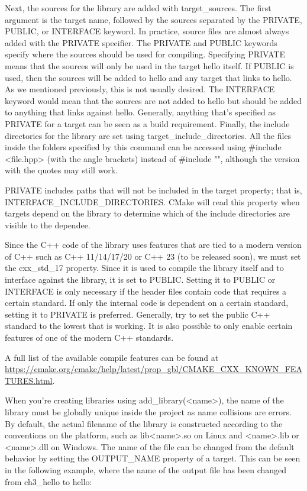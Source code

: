 Next, the sources for the library are added with target\_sources. The first argument is the target name, followed by the sources separated by the PRIVATE, PUBLIC, or INTERFACE keyword. In practice, source files are almost always added with the PRIVATE specifier. The PRIVATE and PUBLIC keywords specify where the sources should be used for compiling. Specifying PRIVATE means that the sources will only be used in the target hello itself. If PUBLIC is used, then the sources will be added to hello and any target that links to hello. As we mentioned previously, this is not usually desired. The INTERFACE keyword would mean that the sources are not added to hello but should be added to anything that links against hello. Generally, anything that's specified as PRIVATE for a target can be seen as a build requirement. Finally, the include directories for the library are set using target\_include\_directories. All the files inside the folders specified by this command can be accessed using \#include <file.hpp> (with the angle brackets) instead of \#include "", although the version with the quotes may still work.

PRIVATE includes paths that will not be included in the target property; that is, INTERFACE\_INCLUDE\_DIRECTORIES. CMake will read this property when targets depend on the library to determine which of the include directories are visible to the dependee.

Since the C++ code of the library uses features that are tied to a modern version of C++ such as C++ 11/14/17/20 or C++ 23 (to be released soon), we must set the cxx\_std\_17 property. Since it is used to compile the library itself and to interface against the library, it is set to PUBLIC. Setting it to PUBLIC or INTERFACE is only necessary if the header files contain code that requires a certain standard. If only the internal code is dependent on a certain standard, setting it to PRIVATE is preferred. Generally, try to set the public C++ standard to the lowest that is working. It is also possible to only enable certain features of one of the modern C++ standards.

A full list of the available compile features can be found at \url{https://cmake.org/cmake/help/latest/prop_gbl/CMAKE\_CXX\_KNOWN\_FEATURES.html}.


When you're creating libraries using add\_library(<name>), the name of the library must be globally unique inside the project as name collisions are errors. By default, the actual filename of the library is constructed according to the conventions on the platform, such as lib<name>.so on Linux and <name>.lib or <name>.dll on Windows. The name of the file can be changed from the default behavior by setting the OUTPUT\_NAME property of a target. This can be seen in the following example, where the name of the output file has been changed from ch3\_hello to hello:

